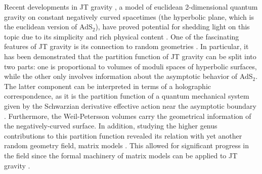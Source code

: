 \documentclass[a4paper,11pt]{article}
\begin{document}
Recent developments in JT gravity \cite{Jackiw:1984je,Teitelboim:1983ux}, a model of euclidean 2-dimensional quantum gravity on constant negatively curved spacetimes (the hyperbolic plane, which is the euclidean version of AdS$_2$), have proved potential for shedding light on this topic due to its simplicity and rich physical content \cite{Mertens:2022irh}. One of the fascinating features of JT gravity is its connection to random geometries \cite{Witten:2020bvl}.  In particular, it has been demonstrated that the partition function of JT gravity can be split into two parts: one is proportional to volumes of moduli spaces of hyperbolic surfaces, while the other only involves information about the asymptotic behavior of AdS$_2$. The latter component can be interpreted in terms of a holographic correspondence, as it is the partition function of a quantum mechanical system given by the Schwarzian derivative effective action near the asymptotic boundary \cite{Maldacena:2016upp, Kitaev}. Furthermore, the Weil-Petersson volumes carry the geometrical information of the negatively-curved surface. In addition, studying the higher genus contributions to this partition function revealed its relation with yet another random geometry field, matrix models \cite{Saad:2019lba,Stanford:2019vob}. This allowed for significant progress in the field since the formal machinery of matrix models \cite{Eynard:2016yaa} can be applied to JT gravity \cite{Johnson:2019eik}. 
\end{document}
